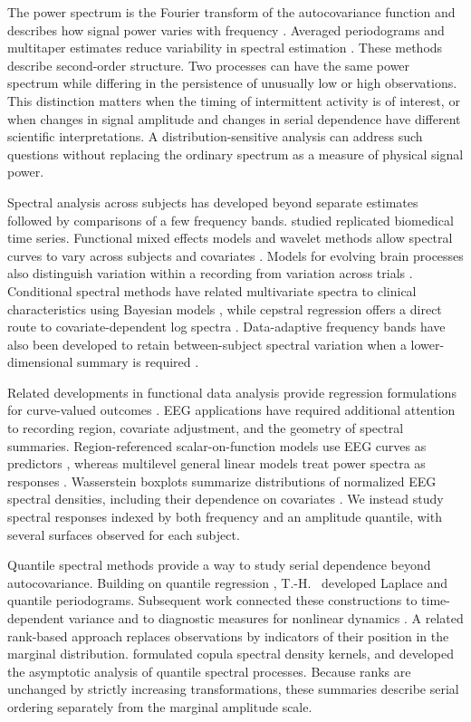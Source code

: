 \documentclass[12pt,a4paper]{article}
\begin{document}
The power spectrum is the Fourier transform of the autocovariance function and describes how signal power varies with frequency \citep{Brillinger1981,Priestley1981,Shumway2017}. Averaged periodograms and multitaper estimates reduce variability in spectral estimation \citep{Welch1967,Thomson1982}. These methods describe second-order structure. Two processes can have the same power spectrum while differing in the persistence of unusually low or high observations. This distinction matters when the timing of intermittent activity is of interest, or when changes in signal amplitude and changes in serial dependence have different scientific interpretations. A distribution-sensitive analysis can address such questions without replacing the ordinary spectrum as a measure of physical signal power.

Spectral analysis across subjects has developed beyond separate estimates followed by comparisons of a few frequency bands. \citet{Diggle1997} studied replicated biomedical time series. Functional mixed effects models and wavelet methods allow spectral curves to vary across subjects and covariates \citep{Krafty2011,Freyermuth2010,Chau2016}. Models for evolving brain processes also distinguish variation within a recording from variation across trials \citep{Fiecas2016}. Conditional spectral methods have related multivariate spectra to clinical characteristics using Bayesian models \citep{Krafty2017,LiZ2021}, while cepstral regression offers a direct route to covariate-dependent log spectra \citep{LiDong2025}. Data-adaptive frequency bands have also been developed to retain between-subject spectral variation when a lower-dimensional summary is required \citep{Brubaker2026}.

Related developments in functional data analysis provide regression formulations for curve-valued outcomes \citep{Ramsay2005,Morris2015}. EEG applications have required additional attention to recording region, covariate adjustment, and the geometry of spectral summaries. Region-referenced scalar-on-function models use EEG curves as predictors \citep{Scheffler2019}, whereas multilevel general linear models treat power spectra as responses \citep{Quinn2024}. Wasserstein boxplots summarize distributions of normalized EEG spectral densities, including their dependence on covariates \citep{Liu2026}. We instead study spectral responses indexed by both frequency and an amplitude quantile, with several surfaces observed for each subject.

Quantile spectral methods provide a way to study serial dependence beyond autocovariance. Building on quantile regression \citep{Koenker1978}, T.-H.~\citet{Li2008,Li2012} developed Laplace and quantile periodograms. Subsequent work connected these constructions to time-dependent variance and to diagnostic measures for nonlinear dynamics \citep{Li2014,Li2021}. A related rank-based approach replaces observations by indicators of their position in the marginal distribution. \citet{Dette2015} formulated copula spectral density kernels, and \citet{Kley2016} developed the asymptotic analysis of quantile spectral processes. Because ranks are unchanged by strictly increasing transformations, these summaries describe serial ordering separately from the marginal amplitude scale.
\end{document}
